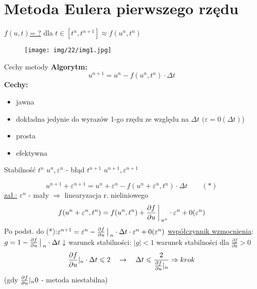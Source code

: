 \section{Metoda Eulera pierwszego rzędu}
\begin{frame}
  \underline{$f(u,t)$= ?} \quad dla  \quad $t \in [t^n,t^{n+1}] \approx f(u^n,t^n)$
  \begin{figure}
	\texttt{[image: img/22/img1.jpg]}
	\end{figure}
\end{frame}
\begin{frame}{Cechy metody}
  \textbf{Algorytm:}
  $$u^{n+1} = u^n - f(u^n, t^n) \cdot \Delta t$$
  \textbf{Cechy:}
  \begin{itemize}
    \item jawna
    \item dokładna jedynie do wyrazów 1-go rzędu ze względu na $\Delta t$ \quad $(\varepsilon=0(\Delta t)$)
    \item prosta
    \item efektywna
  \end{itemize}
\end{frame}
\begin{frame}{Stabilność}
  $t^n$ \quad $u^n, \varepsilon^n$ - błąd \qquad
  $t^{n+1}$ \quad $u^{n+1}, \varepsilon^{n+1}$ 

  $$u^{n+1} + \varepsilon^{n+1} = u^n+\varepsilon^n-f(u^n+\varepsilon^n,t^n)\cdot \Delta t \qquad(*)$$
  \underline{zał.:} $\varepsilon^n$ - mały $\Rightarrow$ linearyzacja r. nieliniowego
  $$f(u^n+\varepsilon^n,t^n) = f(u^n,t^n)+\frac{\partial f}{\partial u}{\bigg\arrowvert}_{u^n} \cdot \varepsilon^n+0(\varepsilon^n)$$
  Po podst. do (*):\qquad $\varepsilon^{n+1} = \varepsilon^n-\frac{\partial f}{\partial u}\big\arrowvert_n \cdot \Delta t \cdot \varepsilon^n +0(\varepsilon^n)$ \newline
  \underline{współczynnik wzmocnienia}:\qquad $g = 1- \frac{\partial f}{\partial u}{\big\arrowvert}_n \cdot \Delta t\downarrow$
  warunek stabilności: $|g|<1$ warunek stabilności dla $\frac{\partial f}{\partial u}>0$
  $$\frac{\partial f}{\partial u}\arrowvert_n \cdot \Delta t \leqslant 2 \quad 
  \rightarrow \quad \Delta t \leqslant \frac{2}{\frac{\partial f}{\partial u}\arrowvert_n} \Rightarrow krok$$
  (gdy $\frac{\partial f}{\partial u}\arrowvert_n 0$ - metoda niestabilna)
\end{frame}

